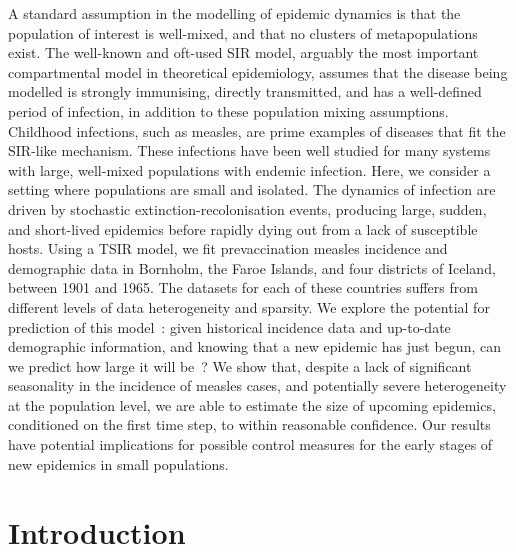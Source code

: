 \documentclass[10pt]{article}
\begin{document}
A standard assumption in the modelling of epidemic dynamics is that the population of interest is well-mixed, and that no clusters of metapopulations exist. The well-known and oft-used SIR model, arguably the most important compartmental model in theoretical epidemiology, assumes that the disease being modelled is strongly immunising, directly transmitted, and has a well-defined period of infection, in addition to these population mixing assumptions. Childhood infections, such as measles, are prime examples of diseases that fit the SIR-like mechanism. These infections have been well studied for many systems with large, well-mixed populations with endemic infection. Here, we consider a setting where populations are small and isolated. The dynamics of infection are driven by stochastic extinction-recolonisation events, producing large, sudden, and short-lived epidemics before rapidly dying out from a lack of susceptible hosts. Using a TSIR model, we fit prevaccination measles incidence and demographic data in Bornholm, the Faroe Islands, and four districts of Iceland, between 1901 and 1965. The datasets for each of these countries suffers from different levels of data heterogeneity and sparsity. We explore the potential for prediction of this model~: given historical incidence data and up-to-date demographic information, and knowing that a new epidemic has just begun, can we predict how large it will be~? We show that, despite a lack of significant seasonality in the incidence of measles cases, and potentially severe heterogeneity at the population level, we are able to estimate the size of upcoming epidemics, conditioned on the first time step, to within reasonable confidence. Our results have potential implications for possible control measures for the early stages of new epidemics in small populations.













\section*{Introduction}
\end{document}
